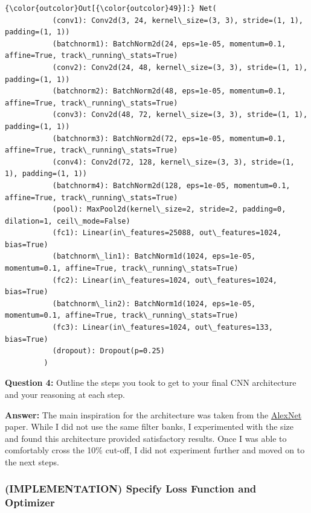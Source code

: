 \documentclass[11pt]{article}
\begin{document}
\begin{Verbatim}[commandchars=\\\{\}]
{\color{outcolor}Out[{\color{outcolor}49}]:} Net(
           (conv1): Conv2d(3, 24, kernel\_size=(3, 3), stride=(1, 1), padding=(1, 1))
           (batchnorm1): BatchNorm2d(24, eps=1e-05, momentum=0.1, affine=True, track\_running\_stats=True)
           (conv2): Conv2d(24, 48, kernel\_size=(3, 3), stride=(1, 1), padding=(1, 1))
           (batchnorm2): BatchNorm2d(48, eps=1e-05, momentum=0.1, affine=True, track\_running\_stats=True)
           (conv3): Conv2d(48, 72, kernel\_size=(3, 3), stride=(1, 1), padding=(1, 1))
           (batchnorm3): BatchNorm2d(72, eps=1e-05, momentum=0.1, affine=True, track\_running\_stats=True)
           (conv4): Conv2d(72, 128, kernel\_size=(3, 3), stride=(1, 1), padding=(1, 1))
           (batchnorm4): BatchNorm2d(128, eps=1e-05, momentum=0.1, affine=True, track\_running\_stats=True)
           (pool): MaxPool2d(kernel\_size=2, stride=2, padding=0, dilation=1, ceil\_mode=False)
           (fc1): Linear(in\_features=25088, out\_features=1024, bias=True)
           (batchnorm\_lin1): BatchNorm1d(1024, eps=1e-05, momentum=0.1, affine=True, track\_running\_stats=True)
           (fc2): Linear(in\_features=1024, out\_features=1024, bias=True)
           (batchnorm\_lin2): BatchNorm1d(1024, eps=1e-05, momentum=0.1, affine=True, track\_running\_stats=True)
           (fc3): Linear(in\_features=1024, out\_features=133, bias=True)
           (dropout): Dropout(p=0.25)
         )
\end{Verbatim}
            
    \textbf{Question 4:} Outline the steps you took to get to your final CNN
architecture and your reasoning at each step.

    \textbf{Answer:} The main inspiration for the architecture was taken
from the
\href{https://papers.nips.cc/paper/4824-imagenet-classification-with-deep-convolutional-neural-networks.pdf}{AlexNet}
paper. While I did not use the same filter banks, I experimented with
the size and found this architecture provided satisfactory results. Once
I was able to comfortably cross the 10\% cut-off, I did not experiment
further and moved on to the next steps.

    \hypertarget{implementation-specify-loss-function-and-optimizer}{%
\subsubsection{(IMPLEMENTATION) Specify Loss Function and
Optimizer}\label{implementation-specify-loss-function-and-optimizer}}
\end{document}
